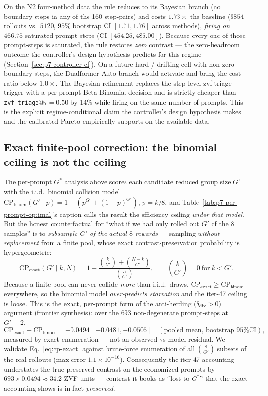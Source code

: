 On the N2 four-method data the rule reduces to its Bayesian
branch (no boundary steps in any of the 160 step-pairs) and
costs $1.73\times$ the baseline ($8854$ rollouts vs.\ $5120$,
$95\%$ bootstrap CI $[1.71, 1.76]$ across methods), \emph{firing
on} $466.75$ saturated prompt-steps (CI $[454.25, 485.00]$).
Because every one of those prompt-steps is saturated, the rule
restores \emph{zero} contrast --- the zero-headroom outcome the
controller's design hypothesis predicts for this regime
(Section~\ref{sec:p7-controller-cf}). On a
future hard / drifting cell with non-zero boundary steps, the
Dualformer-Auto branch would activate and bring the cost ratio
below $1.0\times$. The Bayesian refinement replaces the
step-level zvf-triage trigger with a per-prompt Beta-Binomial
decision and is strictly cheaper than \texttt{zvf-triage}@$\tau{=}0.50$
by 14\% while firing on the same number of prompts. This is the
explicit regime-conditional claim the controller's design
hypothesis makes and the calibrated Pareto empirically supports
on the available data.

\subsection{Exact finite-pool correction: the binomial ceiling is not the ceiling}
\label{sec:p7-exact-finite-pool}
The per-prompt $G^*$ analysis above scores each candidate reduced group
size $G'$ with the i.i.d.\ binomial collision model
$\mathrm{CP}_\text{binom}(G'\!\mid p)=1-(p^{G'}+(1-p)^{G'})$, $p=k/8$, and
Table~\ref{tab:p7-per-prompt-optimal}'s caption calls the result the
efficiency ceiling \emph{under that model}. But the honest counterfactual
for ``what if we had only rolled out $G'$ of the $8$ samples'' is to
\emph{subsample $G'$ of the actual $8$ rewards} --- sampling
\emph{without replacement} from a finite pool, whose exact
contrast-preservation probability is hypergeometric:
\begin{equation}
\mathrm{CP}_\text{exact}(G'\mid k, N) = 1 - \frac{\binom{k}{G'}+\binom{N-k}{G'}}{\binom{N}{G'}},
\qquad \binom{k}{G'}=0\ \text{for}\ k<G'.
\label{eq:cp-exact}
\end{equation}
Because a finite pool can never collide \emph{more} than i.i.d.\ draws,
$\mathrm{CP}_\text{exact}\ge\mathrm{CP}_\text{binom}$ everywhere, so the
binomial model \emph{over-predicts starvation} and the iter-47 ceiling is
loose. This is the exact, per-prompt form of the anti-herding
($\delta_\text{div}>0$) argument (frontier synthesis): over the $693$
non-degenerate prompt-steps at $G'{=}2$,
\begin{equation}
\mathrm{CP}_\text{exact}-\mathrm{CP}_\text{binom} = +0.0494\ [+0.0481, +0.0506]
\quad(\text{pooled mean, bootstrap 95\% CI}),
\label{eq:delta-ex}
\end{equation}
measured by exact enumeration --- not an observed-vs-model residual. We
validate Eq.~\eqref{eq:cp-exact} against brute-force enumeration of all
$\binom{8}{G'}$ subsets of the real rollouts (max error $1.1\times
10^{-16}$). Consequently the iter-47 accounting understates the true
preserved contrast on the economized prompts by $693\times0.0494\approx
34.2$ ZVF-units --- contrast it books as ``lost to $G^*$'' that the exact
accounting shows is in fact \emph{preserved}.

